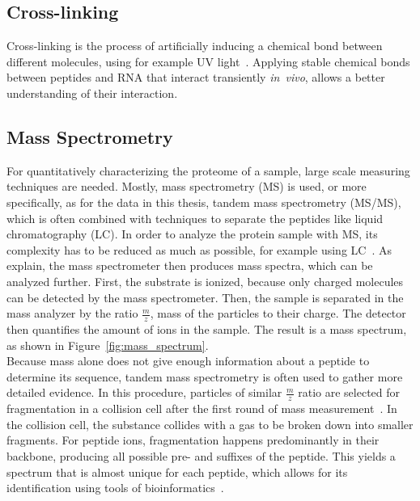 	\subsection{Cross-linking}
	\label{lab:background:cross-linking}
	Cross-linking is the process of artificially inducing a chemical bond between different molecules, using for example UV light~\cite{Sachsenberg2017}. Applying stable chemical bonds between peptides and RNA that interact transiently \textit{in~vivo}, allows a better understanding of their interaction.\\
	\subsection{Mass Spectrometry}
	\label{lab:background:ms}
	For quantitatively characterizing the proteome of a sample, large scale measuring techniques are needed. Mostly, mass spectrometry (MS) is used, or more specifically, as for the data in this thesis, tandem mass spectrometry (MS/MS), which is often combined with techniques to separate the peptides like liquid chromatography (LC). In order to analyze the protein sample with MS, its complexity has to be reduced as much as possible, for example using LC~\cite{Sachsenberg2017}. As~\citet{Han2008} explain, the mass spectrometer then produces mass spectra, which can be analyzed further. First, the substrate is ionized, because only charged molecules can be detected by the mass spectrometer. Then, the sample is separated in the mass analyzer by the ratio $\frac{m}{z}$, mass of the particles to their charge. The detector then quantifies the amount of ions in the sample. The result is a mass spectrum, as shown in Figure~\ref{fig:mass_spectrum}.\\
	Because mass alone does not give enough information about a peptide to determine its sequence, tandem mass spectrometry is often used to gather more detailed evidence. In this procedure, particles of similar $\frac{m}{z}$ ratio are selected for fragmentation in a collision cell after the first round of mass measurement~\cite{Sachsenberg2017}. In the collision cell, the substance collides with a gas to be broken down into smaller fragments. For peptide ions, fragmentation happens predominantly in their backbone, producing all possible pre- and suffixes of the peptide. This yields a spectrum that is almost unique for each peptide, which allows for its identification using tools of bioinformatics~\cite{Angel2012}.
	\renewcommand{\baselinestretch}{0.9}
